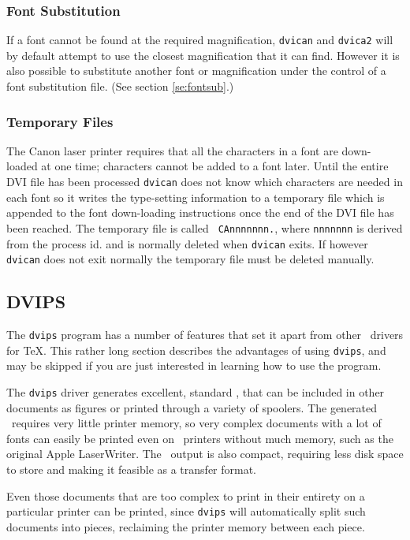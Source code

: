 \subsubsection{Font Substitution}


If a font cannot be found at the required magnification, \verb+dvican+ and \verb+dvica2+ 
will by default
attempt to use the closest magnification that it can find. However it is also
possible to substitute another font or magnification under the control of a font
substitution file.  (See section \ref{se:fontsub}.)

\subsubsection{Temporary Files}

The Canon laser printer requires that all the characters in a font are down-%
loaded at one time; characters cannot be added to a font later. Until the
entire DVI file has been processed \verb+dvican+ does not know which characters are
needed in each font so it writes the type-setting information to a
temporary file which is appended to the font down-loading instructions once the
end of the DVI file has been reached. The temporary file is called {\tt
CAnnnnnnn.}, where {\tt nnnnnnn} is derived from the process id. and is normally
deleted when \verb+dvican+ exits. If however \verb+dvican+ does not exit normally the
temporary file must be deleted manually. 

\subsection{DVIPS}
\label{se:dvidvips}


The {\tt dvips} program has a number of features that set it apart from other
\PS\ drivers for \TeX.  This rather long section describes the advantages
of using {\tt dvips}, and may be skipped if you are just interested in learning
how to use the program.

The {\tt dvips} driver generates excellent, standard \PS, that can be
included in other documents as figures or printed through a variety of
spoolers.  The generated \PS\ requires very little printer memory,
so very complex documents with a lot of fonts can easily be printed even
on \PS\ printers without much memory, such as the original Apple
LaserWriter.  The \PS\ output is also compact, requiring less disk
space to store and making it feasible as a transfer format.

Even those documents that are too complex to print in their entirety
on a particular printer
can be printed, since {\tt dvips} will automatically split such documents
into pieces, reclaiming the printer memory between each piece.

